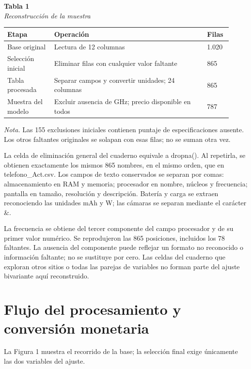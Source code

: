 \documentclass[12pt,letterpaper]{article}
\begin{document}
\begin{center}\begin{minipage}{\linewidth}\textbf{Tabla 1}\\\textit{Reconstrucción de la muestra}\\\begin{singlespace}\small
\begin{tabular}{@{}p{0.1987\linewidth}p{0.6261\linewidth}p{0.0983\linewidth}@{}}\toprule
\textbf{Etapa} & \textbf{Operación} & \textbf{Filas}\\\midrule
Base original & Lectura de 12 columnas & 1.020\\
Selección inicial & Eliminar filas con cualquier valor faltante & 865\\
Tabla procesada & Separar campos y convertir unidades; 24 columnas & 865\\
Muestra del modelo & Excluir ausencia de GHz; precio disponible en todos & 787\\
\bottomrule\end{tabular}\end{singlespace}
\small\textit{Nota.} Las 155 exclusiones iniciales contienen puntaje de especificaciones ausente. Los otros faltantes originales se solapan con esas filas; no se suman otra vez.
\end{minipage}\end{center}
La celda de eliminación general del cuaderno equivale a dropna(). Al repetirla, se obtienen exactamente los mismos 865 nombres, en el mismo orden, que en telefono\_Act.csv. Los campos de texto conservados se separan por comas: almacenamiento en RAM y memoria; procesador en nombre, núcleos y frecuencia; pantalla en tamaño, resolución y descripción. Batería y carga se extraen reconociendo las unidades mAh y W; las cámaras se separan mediante el carácter \&.

La frecuencia se obtiene del tercer componente del campo procesador y de su primer valor numérico. Se reprodujeron las 865 posiciones, incluidos los 78 faltantes. La ausencia del componente puede reflejar un formato no reconocido o información faltante; no se sustituye por cero. Las celdas del cuaderno que exploran otros sitios o todas las parejas de variables no forman parte del ajuste bivariante aquí reconstruido.

\clearpage
\section*{Flujo del procesamiento y conversión monetaria}
La Figura 1 muestra el recorrido de la base; la selección final exige únicamente las dos variables del ajuste.
\end{document}
